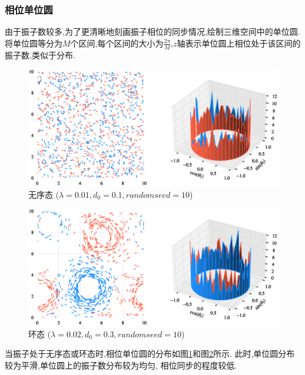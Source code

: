 \documentclass{article}
\begin{document}
\subsubsection{相位单位圆}

由于振子数较多,为了更清晰地刻画振子相位的同步情况,绘制三维空间中的单位圆. 将单位圆等分为$M$个区间,每个区间的大小为$\frac{2\pi}{M}$,$z$轴表示单位圆上相位处于该区间的振子数,类似于分布.

\begin{figure}[H]
	\centering
	\includegraphics[width=\textwidth]{./figs/CorrectCoupling_uniform_0.010_0.10.eps}
	\vspace{-1cm}
	\caption{无序态 ($\lambda=0.01, d_0=0.1, random seed=10$)}
	\label{fig:fig231.1}
\end{figure}

\begin{figure}[H]
	\centering
	\includegraphics[width=\textwidth]{./figs/CorrectCoupling_uniform_0.020_0.30.eps}
	\vspace{-1cm}
	\caption{环态 ($\lambda=0.02, d_0=0.3, random seed=10$)}
	\label{fig:fig231.2}
\end{figure}

当振子处于无序态或环态时,相位单位圆的分布如图\ref{fig:fig231.1}和图\ref{fig:fig231.2}所示. 此时,单位圆分布较为平滑,单位圆上的振子数分布较为均匀, 相位同步的程度较低.
\end{document}
